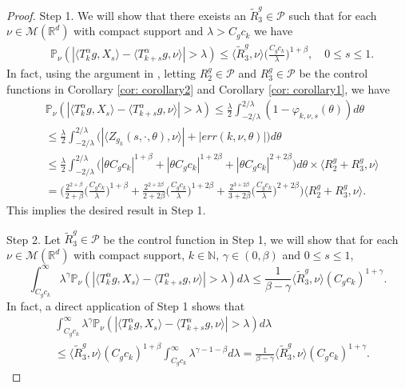 \documentclass[12pt,oneside,english]{amsart}
\theoremstyle{plain}
\theoremstyle{definition}
\numberwithin{equation}{section}
\begin{document}
{\begin{proof}
    Step 1. We will show that there exeists an $\tilde R^g_3 \in \mathcal P$ such that for each $\nu \in \mathcal M(\mathbb R^d)$ with compact support and $\lambda > C_g c_k$ we have
\begin{align}
    &\mathbb{P}_{\nu}(|\langle T_k^{\alpha}g, X_s\rangle-\langle T_{k+s}^{\alpha}g,\nu\rangle|>\lambda)
    \leq \langle \tilde R^g_3,\nu\rangle \Big(\frac{C_g c_k}{\lambda}\Big)^{1+\beta}, \quad 0\leq s \leq 1.
\end{align}
    In fact, using the argument in \cite[Proof of Theorem 3.3.6]{Durrett2010Probability}, letting $R^g_2 \in \mathcal P$ and $R^g_3 \in \mathcal P$ be the control functions in Corollary \ref{cor: corollary2} and Corollary \ref{cor: corollary1}, we have
\begin{align}
    &\mathbb{P}_{\nu}(|\langle T_k^{\alpha}g, X_s\rangle-\langle T_{k+s}^{\alpha}g,\nu\rangle|>\lambda)
    \leq \frac{\lambda}{2}\int_{-2/\lambda}^{2/\lambda}(1-\varphi_{k,\nu,s}(\theta))d\theta
    \\&\leq \frac{\lambda}{2}\int_{-2/\lambda}^{2/\lambda}\big(|\langle Z_{g_k}(s,\cdot,\theta),\nu\rangle|+|err(k,\nu,\theta)|\big)d\theta
    \\&\leq \frac{\lambda}{2}\int_{-2/\lambda}^{2/\lambda}\big(|\theta C_g c_k|^{1+\beta}+|\theta C_g c_k|^{1+2\beta}+ |\theta C_g c_k|^{2+2\beta}\big)d\theta \times \langle R^g_2+R^g_3,\nu\rangle
    \\& = \bigg(\frac{2^{2+\beta}}{2+\beta}\Big(\frac{C_g c_k}{\lambda}\Big)^{1+\beta}+\frac{2^{2+2\beta}}{2+2\beta}\Big(\frac{C_g c_k}{\lambda}\Big)^{1+2\beta} + \frac{2^{3+2\beta}}{3+2\beta}\Big(\frac{C_g c_k}{\lambda}\Big)^{2+2\beta}\bigg) \langle R^g_2+R^g_3,\nu\rangle.
\end{align}
    This implies the desired result in Step 1.

    Step 2. Let $\tilde R^g_3\in \mathcal P$ be the control function in Step 1, we will show that for each $\nu\in \mathcal M(\mathbb R^d)$ with compact support, $k\in \mathbb N$, $\gamma \in (0,\beta)$ and $0\leq s \leq 1$,
\[
    \int_{C_g c_k}^\infty \lambda^{\gamma} \mathbb P_\nu(|\langle T_k^\alpha g,X_s\rangle - \langle T_{k+s}^\alpha g, \nu\rangle|> \lambda) d\lambda
    \leq \frac{1}{\beta-\gamma} \langle \tilde R^g_3,\nu\rangle (C_g c_k)^{1+\gamma}.
\]
    In fact, a direct application of Step 1 shows that
\begin{align}
    &\int_{C_g c_k}^\infty \lambda^{\gamma} \mathbb P_\nu(|\langle T_k^\alpha g,X_s\rangle - \langle T_{k+s}^\alpha g, \nu\rangle|> \lambda) d\lambda
    \\&\leq \langle \tilde R^g_3,\nu \rangle (C_g c_k)^{1+\beta}\int_{C_g c_k}^\infty \lambda^{\gamma-1-\beta}d\lambda
    = \frac{1}{\beta-\gamma}\langle \tilde R^g_3,\nu \rangle (C_g c_k)^{1+\gamma}.
\end{align}


\end{proof}}
\end{document}
